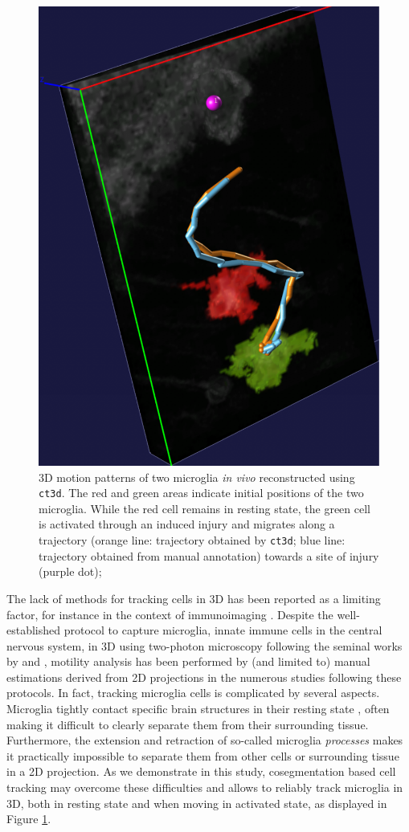 \begin{figure}
  \centering
  \includegraphics[width=.7\linewidth]{images/coseg_fig1}
  \caption[3D motion patterns of two microglia \textit{in vivo} 
   reconstructed using \texttt{ct3d}]{3D motion patterns of two microglia \textit{in vivo}
    reconstructed using \texttt{ct3d}.  The red and green areas
    indicate initial positions of the two microglia. While the red
    cell remains in resting state, the green cell is activated through
    an induced injury and migrates along a trajectory (orange line:
    trajectory obtained by \texttt{ct3d}; blue line: trajectory
    obtained from manual annotation) towards a site of injury (purple
    dot);}
  \label{fig:coseg-fig1}
\end{figure}

The lack of methods for tracking cells in 3D has been reported as a
limiting factor, for instance in the context of immunoimaging
\cite{Cahalan:08}. Despite the well-established protocol to capture
microglia, innate immune cells in the central nervous system, in 3D
using two-photon microscopy following the seminal works by
\cite{Nimmerjahn:05} and \cite{Davalos:05}, motility analysis has
been performed by (and limited to) manual estimations derived from 2D
projections \cite{Davalos:08} in the numerous studies following these
protocols. In fact, tracking microglia cells is complicated by several
aspects. Microglia tightly contact specific brain structures in their
resting state \cite{Wake:09}, often making it difficult to clearly
separate them from their surrounding tissue. Furthermore, the
extension and retraction of so-called microglia \emph{processes} makes
it practically impossible to separate them from other cells or
surrounding tissue in a 2D projection. As we demonstrate in this
study, cosegmentation based cell tracking may overcome these
difficulties and allows to reliably track microglia in 3D, both in
resting state and when moving in activated state, as displayed in
Figure \ref{fig:coseg-fig1}.

